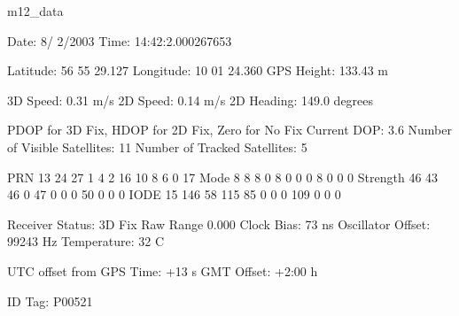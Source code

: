 
m12_data

Date:  8/ 2/2003
Time: 14:42:2.000267653

Latitude:     56 55 29.127
Longitude:  10 01 24.360
GPS Height:	  133.43 m

3D Speed:	0.31 m/s
2D Speed:	0.14 m/s
2D Heading: 149.0 degrees

PDOP for 3D Fix, HDOP for 2D Fix, Zero for No Fix
Current DOP:   3.6
Number of Visible Satellites:	11
Number of Tracked Satellites:	5

 PRN	       13    24    27	  1	4     2    16	 10	8     6     0	 17
 Mode		8     8     8	  0	8     0     0	  0	8     0     0	  0
 Strength    46    43	 46	0    47     0	  0	0    50     0	  0	0
 IODE	     15   146	 58   115    85     0	  0	0   109     0	  0	0

Receiver Status:	       3D Fix
Raw Range	 0.000
Clock Bias:	    73	  ns
Oscillator Offset:  99243 Hz
Temperature: 32 C

UTC offset from GPS Time:  +13 s
GMT Offset:	+2:00 h

ID Tag: P00521

